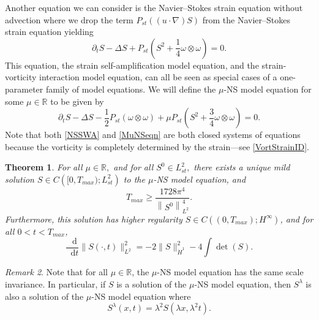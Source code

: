 \documentclass[11pt]{article}
\theoremstyle{plain}
\newtheorem{theorem}{Theorem}[section]
\theoremstyle{remark}
\newtheorem{remark}[theorem]{Remark}
\numberwithin{equation}{section}
\newcommand{\diff}{\mathop{}\!\mathrm{d}}
\begin{document}
Another equation we can consider is the Navier--Stokes strain equation without advection where we drop the term
$P_{st}((u\cdot\nabla)S)$ from the Navier--Stokes strain equation yielding
\begin{equation} \label{NSSWA}
 \partial_t S-\Delta S +P_{st}\left(S^2
    +\frac{1}{4}\omega\otimes\omega \right)=0.   
\end{equation}
This equation, the strain self-amplification model equation, and the strain-vorticity interaction model equation, can all be seen as special cases of a one-parameter family of model equations.
We will define the $\mu$-NS model equation for some $\mu\in\mathbb{R}$ to be given by
\begin{equation} \label{MuNSeqn}
    \partial_t S-\Delta S
    -\frac{1}{2}P_{st}\left(\omega\otimes\omega\right)
    +\mu P_{st}\left(S^2+\frac{3}{4}\omega\otimes\omega
    \right)=0.
\end{equation}
Note that both \eqref{NSSWA} and \eqref{MuNSeqn} are both closed systems of equations because the vorticity is completely determined by the strain---see \eqref{VortStrainID}.

\begin{theorem} \label{MildMuNS}
For all $\mu\in\mathbb{R},$ and for all $S^0\in L^2_{st},$
there exists a unique mild solution
$S\in C\left([0,T_{max});L^2_{st}\right)$ to the $\mu$-NS model equation, and
\begin{equation}
    T_{max}\geq \frac{1728\pi^4}{\left\|S^0\right\|_{L^2}^4}.
\end{equation}
Furthermore, this solution has higher regularity
$S\in C\left((0,T_{max});H^\infty \right)$, 
and for all $0<t<T_{max}$,
\begin{equation}
    \frac{\diff}{\diff t}
    \|S(\cdot,t)\|_{L^2}^2=
    -2\|S\|_{\dot{H}^1}^2-4\int\det(S).
\end{equation}
\end{theorem}



\begin{remark}
    Note that for all $\mu\in\mathbb{R}$, the $\mu$-NS model equation has the same scale invariance. In particular, if $S$ is a solution of the $\mu$-NS model equation, then $S^\lambda$ is also a solution of the $\mu$-NS model equation where
    \begin{equation}
    S^\lambda(x,t)=
    \lambda^2 S(\lambda x, \lambda^2 t).
    \end{equation}
\end{remark}
\end{document}
